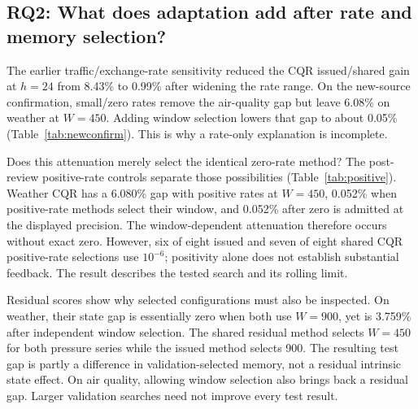 \subsection{RQ2: What does adaptation add after rate and memory selection?}\label{sec:rates}
The earlier traffic/exchange-rate sensitivity reduced the CQR issued/shared gain
at $h=24$ from 8.43\% to 0.99\% after widening the rate range. On the new-source
confirmation, small/zero rates remove the air-quality gap but leave 6.08\% on
weather at $W=450$. Adding window selection lowers that gap to about 0.05\%
(Table~\ref{tab:newconfirm}). This is why a rate-only explanation is incomplete.

\begin{table}[!htbp]\centering\small
\caption{Locked new-source confirmation at $h=24$. Mean paired issued/shared
score gain (\%), four pairs per source. Only the last column selects memory.}
\label{tab:newconfirm}\end{table}

Does this attenuation merely select the identical zero-rate method? The post-review
positive-rate controls separate those possibilities (Table~\ref{tab:positive}).
Weather CQR has a 6.080\% gap with positive rates at $W=450$, 0.052\% when
positive-rate methods select their window, and 0.052\% after zero is admitted
at the displayed precision. The window-dependent attenuation therefore occurs
without exact zero. However, six of eight issued and seven of eight shared CQR
positive-rate selections use $10^{-6}$; positivity alone does not establish
substantial feedback. The result describes the tested search and its rolling limit.

\begin{table}[!htbp]\centering\small
\caption{Exploratory positive-rate decomposition, $h=24$, mean paired state gain
(\%). The first three columns exclude zero. ``Select $W$'' uses 200, 450 and 900;
``Add zero'' differs only by admitting zero. Tiny rates remain eligible.}
\label{tab:positive}\end{table}

Residual scores show why selected configurations must also be inspected. On weather,
their state gap is essentially zero when both use $W=900$, yet is 3.759\% after
independent window selection. The shared residual method selects $W=450$ for both
pressure series while the issued method selects 900. The resulting test gap is
partly a difference in validation-selected memory, not a residual intrinsic state
effect. On air quality, allowing window selection also brings back a residual gap.
Larger validation searches need not improve every test result.

